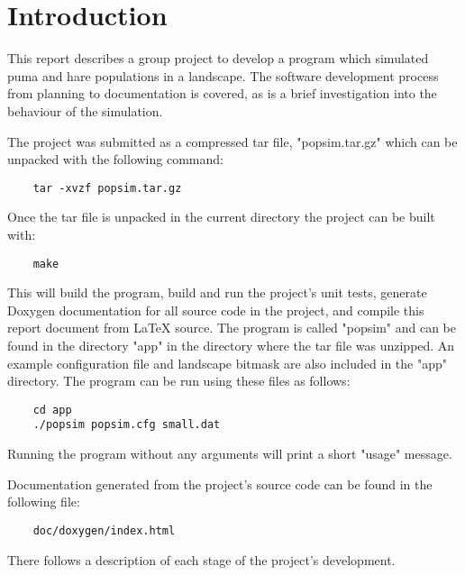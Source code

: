 \section{Introduction}
\label{Introduction}
This report describes a group project to develop a program which simulated puma and hare populations in a landscape.  The software development process from planning to documentation is covered, as is a brief investigation into the behaviour of the simulation.

The project was submitted as a compressed tar file, "popsim.tar.gz" which can be unpacked with the following command:

\begin{lstlisting}
	tar -xvzf popsim.tar.gz
\end{lstlisting}

Once the tar file is unpacked in the current directory the project can be built with:

\begin{lstlisting}
	make
\end{lstlisting}

This will build the program, build and run the project's unit tests, generate Doxygen documentation for all source code in the project, and compile this report document from LaTeX source.  The program is called "popsim" and can be found in the directory "app" in the directory where the tar file was unzipped.  An example configuration file and landscape bitmask are also included in the "app" directory.  The program can be run using these files as follows:

\begin{lstlisting}
	cd app
	./popsim popsim.cfg small.dat
\end{lstlisting}

Running the program without any arguments will print a short "usage" message.

Documentation generated from the project's source code can be found in the following file:

\begin{lstlisting}
	doc/doxygen/index.html
\end{lstlisting}

There follows a description of each stage of the project's development.
